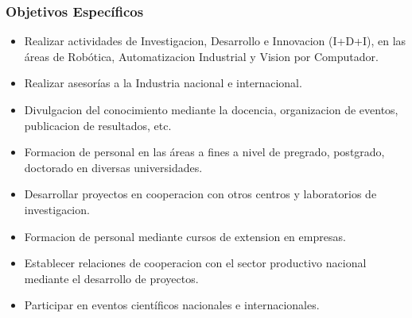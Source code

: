 \subsubsection{Objetivos Específicos}

\begin{itemize}
    \itemsep1pt \parskip0pt 
    \item Realizar actividades de Investigacion, Desarrollo e Innovacion (I+D+I), en las áreas de Robótica, Automatizacion Industrial y Vision por Computador.
    \item Realizar asesorías a la Industria nacional e internacional.
    \item Divulgacion del conocimiento mediante la docencia, organizacion de eventos, publicacion de resultados, etc.
    \item Formacion de personal en las áreas a fines a nivel de pregrado, postgrado, doctorado en diversas universidades.
    \item Desarrollar proyectos en cooperacion con otros centros y laboratorios de investigacion.
    \item Formacion de personal mediante cursos de extension en empresas.
    \item Establecer relaciones de cooperacion con el sector productivo nacional mediante el desarrollo de proyectos.
    \item Participar en eventos científicos nacionales e internacionales.
\end{itemize}